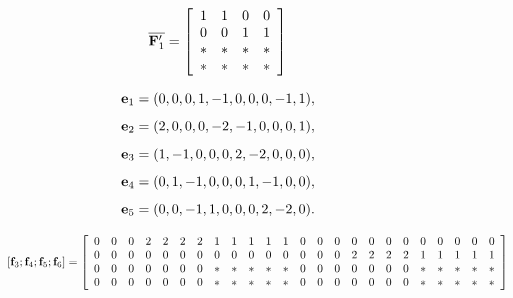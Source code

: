 \documentclass[conference,letterpaper]{IEEEtran}
\begin{document}
\begin{equation} \label{eq:scheme 3 sub sub transmission}
\overline{{\bf F}^{\prime}_1}= \left[
\begin{array}{cccc}
  1 & 1 & 0 & 0  \\
  0 & 0 & 1 & 1 \\
  * & * & * & *  \\
  * & * & * & *
\end{array}
 \right]
\end{equation}

\[
{\bf e}_1 = (0, 0, 0, 1, -1, 0, 0, 0, -1, 1),
\]
\[
{\bf e}_2 = (2, 0, 0, 0, -2, -1, 0, 0, 0, 1),
\]
\[
{\bf e}_3 = (1, -1, 0, 0, 0, 2, -2, 0, 0, 0),
\]
\[
{\bf e}_4 = (0, 1, -1, 0, 0, 0, 1, -1, 0, 0),
\]
\[
{\bf e}_5 = (0, 0, -1, 1, 0, 0, 0, 2, -2, 0).
\]
\begin{figure}
\begin{equation} \label{eq:scheme 3 transmission of second class}
\begin{aligned}
\left[ {{\bf f}}_3 ;  {{\bf f}}_4 ;  {{\bf f}}_5 ;  {{\bf f}}_6 \right] = 
 \left[
\begin{array}{cccccccccccccccccccccccc}
 0 & 0 & 0 &  2 & 2 & 2 & 2 &  1 & 1 & 1 & 1 & 1 & 0 & 0 & 0 & 0 & 0 & 0 & 0 & 0 & 0 & 0 & 0 & 0 \\
 0 & 0 & 0 & 0 & 0 & 0 & 0 & 0 & 0 & 0 & 0 & 0 & 0 & 0 & 0 & 2 & 2 & 2 & 2 & 1 & 1 & 1 & 1 & 1 \\
 0 & 0 & 0 & 0 & 0 & 0 & 0 & * & * & * & * & * & 0 & 0 & 0 & 0 & 0 & 0 & 0 & * & * & * & * & * \\
 0 & 0 & 0 & 0 & 0 & 0 & 0 & * & * & * & * & * & 0 & 0 & 0 & 0 & 0 & 0 & 0 & * & * & * & * & *
\end{array}
 \right]
\end{aligned}
\end{equation}
\end{figure}
\end{document}
